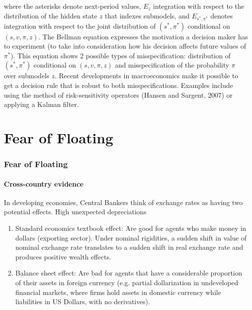 \documentclass{beamer}
\begin{document}
\begin{frame} 
where the asterisks denote next-period values, $E_z$ integration with
respect to the distribution of the hidden state $z$ that indexes submodels, and
$E_{s^*,\pi^*}$ denotes integration with respect to the joint distribution of
$(s^*,\pi^*)$ conditional on $(s,v,\pi,z)$. The Bellman equation expresses the motivation
a decision maker has to experiment (to take into consideration how his decision
affects future values of $\pi^*$). This equation shows 2 possible types of 
misspecification: distribution of $(s^*, \pi^*)$ conditional on $(s,v,\pi,z)$
and misspecification of the probability $\pi$ over submodels $z$.
\newline
\newline
Recent developments in macroeconomics make it possible to get a decision rule that is
robust to both misspecifications. Examples include using  the method of risk-sensitivity operators (Hansen and Sargent, 2007)
or applying a Kalman filter.
\end{frame}

\section{Fear of Floating}
 \begin{frame} 
\frametitle{Fear of Floating} 
\framesubtitle{Cross-country evidence} 
In developing economies, Central Bankers think of exchange rates as having two
potential effects. High unexpected depreciations
\begin{enumerate} 
\item Standard economics textbook effect: Are good for agents who make money in dollars (exporting sector). Under
nominal rigidities, a sudden shift in value of nominal exchange rate 
translates to a sudden shift in real exchange rate and produces positive wealth effects.
\item Balance sheet effect: Are bad for agents that have a considerable
proportion of their assets in foreign currency (e.g. partial dollarization in undeveloped
financial markets, where firms hold assets in domestic currency while liabilities in
US Dollars, with no derivatives).
\end{enumerate} 
\end{frame}
\end{document}
